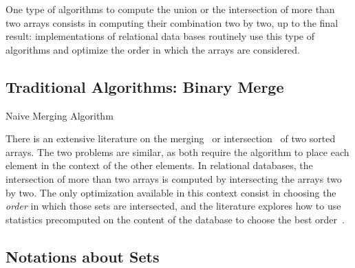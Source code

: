 One type of algorithms to compute the union or the intersection of
more than two arrays consists in computing their combination two by
two, up to the final result: implementations of relational data bases
routinely use this type of algorithms and optimize the order in which
the arrays are considered.



\subsection{Traditional Algorithms: Binary Merge}
\label{sec:trad-algor-binary}

\begin{algorithm}
  \begin{algorithmic}
    \ELSE
       \ENDIF
    \ENDWHILE
  \end{algorithmic}
\caption{Naive Merging Algorithm}
\end{algorithm}


There is an extensive literature on the
merging~\cite{optimalMergingOf2ElementsWithNElements,aSimpleAlgorithmForMergingTwoDisjointLinearlyOrderedSets,improvingTheBoundOnOptimalMerging,significantImprovementsToTheHwangLinMergingAlgorithm,twoProbabilisticResultsOnMerging,averageCaseAnalysisOfTheMergingAlgorithmOfHwangAndLin}
or intersection~\cite{aFastSetIntersectionAlgorithmForSortedSequences}
of two sorted arrays. 
%
The two problems are similar, as both require the algorithm to place
each element in the context of the other elements.
%
In relational databases, the intersection of more than two arrays is
computed by intersecting the arrays two by two.
%
The only optimization available in this context consist in choosing
the {\em order} in which those sets are intersected, and the
literature explores how to use statistics precomputed on the content
of the database to choose the best order~\cite[and its
references]{anOverviewOfQueryOptimizationInRelationalSystems}.


\subsection{Notations about Sets}
\label{sec:notations-about-sets}

